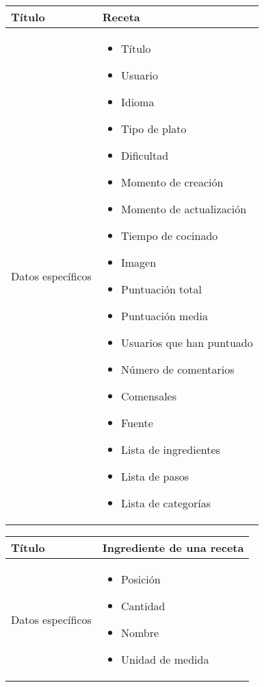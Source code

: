 \begin{center}  
  \begin{tabularx}{\textwidth}{|l|X|}
    \hline

    Título & Receta\\

    \hline
    Datos específicos &

    \begin{itemize}
    \item Título
    \item Usuario
    \item Idioma
    \item Tipo de plato
    \item Dificultad
    \item Momento de creación
    \item Momento de actualización
    \item Tiempo de cocinado
    \item Imagen
    \item Puntuación total
    \item Puntuación media
    \item Usuarios que han puntuado
    \item Número de comentarios
    \item Comensales
    \item Fuente
    \item Lista de ingredientes
    \item Lista de pasos
    \item Lista de categorías
    \end{itemize}
    \\

    \hline
    
  \end{tabularx}
\end{center}

\begin{center}  
  \begin{tabularx}{\textwidth}{|l|X|}
    \hline

    Título & Ingrediente de una receta\\

    \hline
    Datos específicos &

    \begin{itemize}
    \item Posición
    \item Cantidad
    \item Nombre
    \item Unidad de medida
    \end{itemize}
    \\
    
    \hline
    
  \end{tabularx}
\end{center}
    
